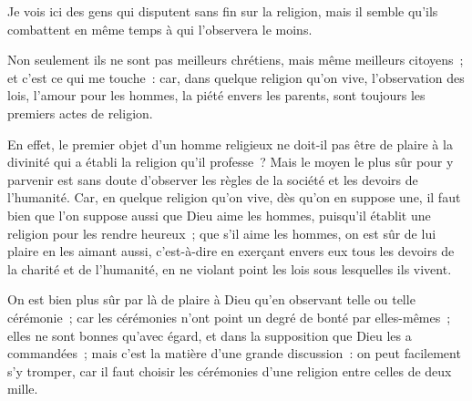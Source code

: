 \documentclass[french,twoside]{book} %
\begin{document}
\noindent Je vois ici des gens qui disputent sans fin sur la religion, mais il semble qu’ils combattent en même temps à qui l’observera le moins.\par
Non seulement ils ne sont pas meilleurs chrétiens, mais même meilleurs citoyens ; et c’est ce qui me touche : car, dans quelque religion qu’on vive, l’observation des lois, l’amour pour les hommes, la piété envers les parents, sont toujours les premiers actes de religion.\par
En effet, le premier objet d’un homme religieux ne doit-il pas être de plaire à la divinité qui a établi la religion qu’il professe ? Mais le moyen le plus sûr pour y parvenir est sans doute d’observer les règles de la société et les devoirs de l’humanité. Car, en quelque religion qu’on vive, dès qu’on en suppose une, il faut bien que l’on suppose aussi que Dieu aime les hommes, puisqu’il établit une religion pour les rendre heureux ; que s’il aime les hommes, on est sûr de lui plaire en les aimant aussi, c’est-à-dire en exerçant envers eux tous les devoirs de la charité et de l’humanité, en ne violant point les lois sous lesquelles ils vivent.\par
On est bien plus sûr par là de plaire à Dieu qu’en observant telle ou telle cérémonie ; car les cérémonies n’ont point un degré de bonté par elles-mêmes ; elles ne sont bonnes qu’avec égard, et dans la supposition que Dieu les a commandées ; mais c’est la matière d’une grande discussion : on peut facilement s’y tromper, car il faut choisir les cérémonies d’une religion entre celles de deux mille.\par
\end{document}
